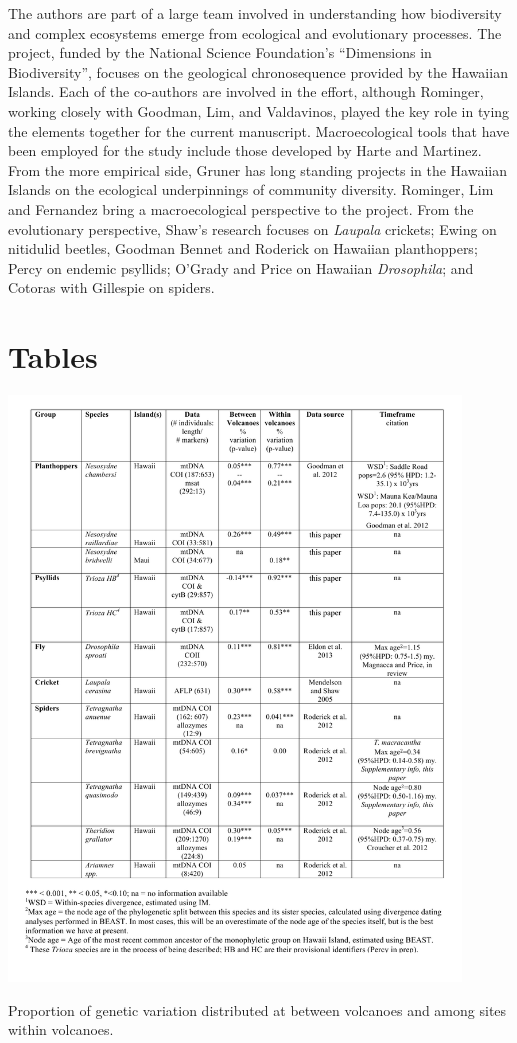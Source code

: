 \documentclass[12pt]{article}
\begin{document}
\begin{linenumbers}
The authors are part of a large team involved in understanding how
biodiversity and complex ecosystems emerge from ecological and
evolutionary processes. The project, funded by the National Science
Foundation's ``Dimensions in Biodiversity'', focuses on the geological
chronosequence provided by the Hawaiian Islands. Each of the
co-authors are involved in the effort, although Rominger, working
closely with Goodman, Lim, and Valdavinos, played the key role in
tying the elements together for the current
manuscript. Macroecological tools that have been employed for the
study include those developed by Harte and Martinez. From the more
empirical side, Gruner has long standing projects in the Hawaiian
Islands on the ecological underpinnings of community
diversity. Rominger, Lim and Fernandez bring a macroecological
perspective to the project. From the evolutionary perspective, Shaw's
research focuses on {\it Laupala} crickets; Ewing on nitidulid
beetles, Goodman Bennet and Roderick on Hawaiian planthoppers; Percy
on endemic psyllids; O'Grady and Price on Hawaiian {\it Drosophila};
and Cotoras with Gillespie on spiders.

\section*{Tables}

\begin{table}[!htb]
  \centering
  \includegraphics[width=0.9\textwidth]{../tab_fst.pdf}
  \caption{Proportion of genetic variation distributed at between
    volcanoes and among sites within volcanoes.}
  \label{tab:fst}
\end{table}


\end{linenumbers}
\end{document}
